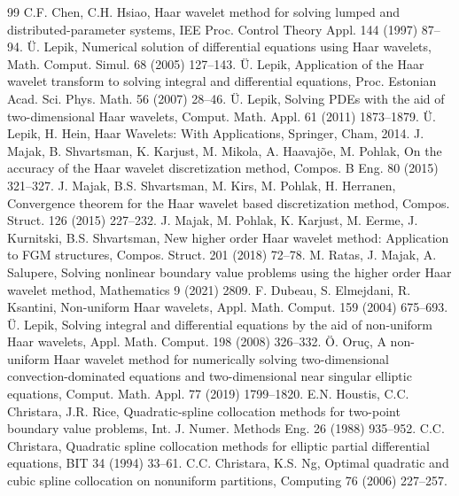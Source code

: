 \documentclass[preprint,12pt]{elsarticle}
\theoremstyle{remark}
\begin{document}
\begin{thebibliography}{99}
 C.F. Chen, C.H. Hsiao, Haar wavelet method for solving lumped and distributed-parameter systems, IEE Proc. Control Theory Appl. 144 (1997) 87--94.
 \"U. Lepik, Numerical solution of differential equations using Haar wavelets, Math. Comput. Simul. 68 (2005) 127--143.
 \"U. Lepik, Application of the Haar wavelet transform to solving integral and differential equations, Proc. Estonian Acad. Sci. Phys. Math. 56 (2007) 28--46.
 \"U. Lepik, Solving PDEs with the aid of two-dimensional Haar wavelets, Comput. Math. Appl. 61 (2011) 1873--1879.
 \"U. Lepik, H. Hein, Haar Wavelets: With Applications, Springer, Cham, 2014.
 J. Majak, B. Shvartsman, K. Karjust, M. Mikola, A. Haavaj\~oe, M. Pohlak, On the accuracy of the Haar wavelet discretization method, Compos. B Eng. 80 (2015) 321--327.
 J. Majak, B.S. Shvartsman, M. Kirs, M. Pohlak, H. Herranen, Convergence theorem for the Haar wavelet based discretization method, Compos. Struct. 126 (2015) 227--232.
 J. Majak, M. Pohlak, K. Karjust, M. Eerme, J. Kurnitski, B.S. Shvartsman, New higher order Haar wavelet method: Application to FGM structures, Compos. Struct. 201 (2018) 72--78.
 M. Ratas, J. Majak, A. Salupere, Solving nonlinear boundary value problems using the higher order Haar wavelet method, Mathematics 9 (2021) 2809.
 F. Dubeau, S. Elmejdani, R. Ksantini, Non-uniform Haar wavelets, Appl. Math. Comput. 159 (2004) 675--693.
 \"U. Lepik, Solving integral and differential equations by the aid of non-uniform Haar wavelets, Appl. Math. Comput. 198 (2008) 326--332.
 \"O. Oru\c{c}, A non-uniform Haar wavelet method for numerically solving two-dimensional convection-dominated equations and two-dimensional near singular elliptic equations, Comput. Math. Appl. 77 (2019) 1799--1820.
 E.N. Houstis, C.C. Christara, J.R. Rice, Quadratic-spline collocation methods for two-point boundary value problems, Int. J. Numer. Methods Eng. 26 (1988) 935--952.
 C.C. Christara, Quadratic spline collocation methods for elliptic partial differential equations, BIT 34 (1994) 33--61.
 C.C. Christara, K.S. Ng, Optimal quadratic and cubic spline collocation on nonuniform partitions, Computing 76 (2006) 227--257.

\end{thebibliography}
\end{document}
